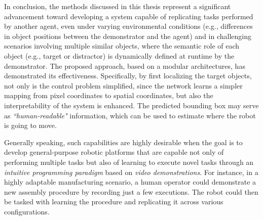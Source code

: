 
In conclusion, the methods discussed in this thesis represent a significant advancement toward developing a system capable of replicating tasks performed by another agent, even under varying environmental conditions (e.g., differences in object positions between the demonstrator and the agent) and in challenging scenarios involving multiple similar objects, where the semantic role of each object (e.g., target or distractor) is dynamically defined at runtime by the demonstrator. The proposed approach, based on a modular architectures, has demonstrated its effectiveness. Specifically, by first localizing the target objects, not only is the control problem simplified, since the network learns a simpler mapping from pixel coordinates to spatial coordinates, but also the interpretability of the system is enhanced. The predicted bounding box may serve as \textit{``human-readable"} information, which can be used to estimate where the robot is going to move.

Generally speaking, such capabilities are highly desirable when the goal is to develop general-purpose robotic platforms that are capable not only of performing multiple tasks but also of learning to execute novel tasks through an \textit{intuitive programming paradigm} based on \textit{video demonstrations}. For instance, in a highly adaptable manufacturing scenario, a human operator could demonstrate a new assembly procedure by recording just a few executions. The robot could then be tasked with learning the procedure and replicating it across various configurations.

